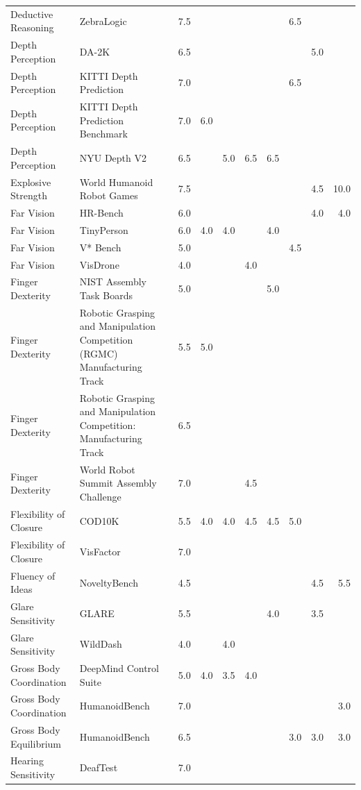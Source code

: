 \begin{longtable}{lp{4.6cm}rrrrrrrr}
Deductive Reasoning & ZebraLogic & 7.5 &  &  &  &  & 6.5 &  &  \\
Depth Perception & DA-2K & 6.5 &  &  &  &  &  & 5.0 &  \\
Depth Perception & KITTI Depth Prediction & 7.0 &  &  &  &  & 6.5 &  &  \\
Depth Perception & KITTI Depth Prediction Benchmark & 7.0 & 6.0 &  &  &  &  &  &  \\
Depth Perception & NYU Depth V2 & 6.5 &  & 5.0 & 6.5 & 6.5 &  &  &  \\
Explosive Strength & World Humanoid Robot Games & 7.5 &  &  &  &  &  & 4.5 & 10.0 \\
Far Vision & HR-Bench & 6.0 &  &  &  &  &  & 4.0 & 4.0 \\
Far Vision & TinyPerson & 6.0 & 4.0 & 4.0 &  & 4.0 &  &  &  \\
Far Vision & V* Bench & 5.0 &  &  &  &  & 4.5 &  &  \\
Far Vision & VisDrone & 4.0 &  &  & 4.0 &  &  &  &  \\
Finger Dexterity & NIST Assembly Task Boards & 5.0 &  &  &  & 5.0 &  &  &  \\
Finger Dexterity & Robotic Grasping and Manipulation Competition (RGMC) Manufacturing Track & 5.5 & 5.0 &  &  &  &  &  &  \\
Finger Dexterity & Robotic Grasping and Manipulation Competition: Manufacturing Track & 6.5 &  &  &  &  &  &  &  \\
Finger Dexterity & World Robot Summit Assembly Challenge & 7.0 &  &  & 4.5 &  &  &  &  \\
Flexibility of Closure & COD10K & 5.5 & 4.0 & 4.0 & 4.5 & 4.5 & 5.0 &  &  \\
Flexibility of Closure & VisFactor & 7.0 &  &  &  &  &  &  &  \\
Fluency of Ideas & NoveltyBench & 4.5 &  &  &  &  &  & 4.5 & 5.5 \\
Glare Sensitivity & GLARE & 5.5 &  &  &  & 4.0 &  & 3.5 &  \\
Glare Sensitivity & WildDash & 4.0 &  & 4.0 &  &  &  &  &  \\
Gross Body Coordination & DeepMind Control Suite & 5.0 & 4.0 & 3.5 & 4.0 &  &  &  &  \\
Gross Body Coordination & HumanoidBench & 7.0 &  &  &  &  &  &  & 3.0 \\
Gross Body Equilibrium & HumanoidBench & 6.5 &  &  &  &  & 3.0 & 3.0 & 3.0 \\
Hearing Sensitivity & DeafTest & 7.0 &  &  &  &  &  &  &  \\

\end{longtable}
